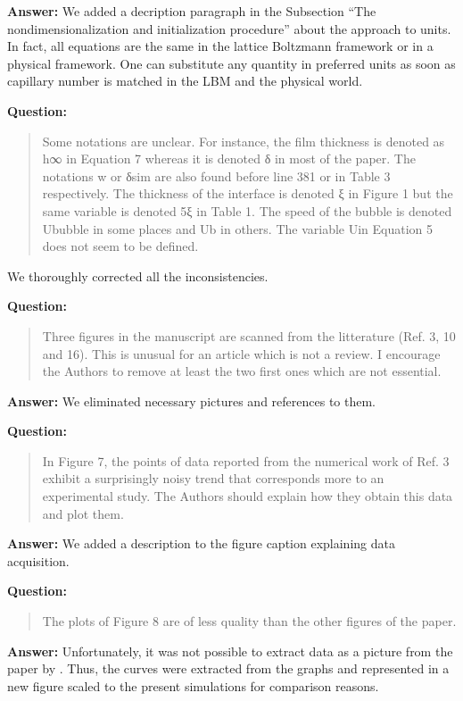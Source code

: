 \documentclass{article}
\begin{document}
\textbf{Answer:} We added a decription paragraph in the Subsection ``The nondimensionalization and
initialization procedure'' about the approach to units. In fact, all equations are the same in the
lattice Boltzmann framework or in a physical framework. One can substitute any quantity in
preferred units as soon as capillary number is matched in the LBM and the physical world. 

\textbf{Question:}
\begin{quotation}
Some notations are unclear. For instance, the ﬁlm thickness is denoted as h∞ in Equation 7 whereas
it is denoted δ in most of the paper. The notations w or δsim are also found before line 381 or in
Table 3 respectively. The thickness of the interface is denoted ξ in Figure 1 but the same variable
is
denoted 5ξ in Table 1. The speed of the bubble is denoted Ububble in some places and Ub in others.
The variable Uin Equation 5 does not seem to be deﬁned.
\end{quotation}

 We thoroughly corrected all the inconsistencies.

\textbf{Question:}
\begin{quotation}
Three ﬁgures in the manuscript are scanned from the litterature (Ref. 3, 10 and 16). This is
unusual
for an article which is not a review. I encourage the Authors to remove at least the two ﬁrst ones
which are not essential.
\end{quotation}

\textbf{Answer:} We eliminated necessary pictures and references to them.

\textbf{Question:} 
\begin{quotation}
In Figure 7, the points of data reported from the numerical work of Ref. 3 exhibit a surprisingly
noisy trend that corresponds more to an experimental study. The Authors should explain how they
obtain this data and plot them.
\end{quotation}

\textbf{Answer:} We added a description to the figure caption explaining data acquisition.

\textbf{Question:} 
\begin{quotation}
The plots of Figure 8 are of less quality than the other ﬁgures of the paper.
\end{quotation}

\textbf{Answer:} Unfortunately, it was not possible to extract data as a picture from the paper by
\citet{sehgal-microchannel}. Thus, the curves were extracted from the graphs and represented in a
new figure scaled to the present simulations for comparison reasons.
\end{document}
